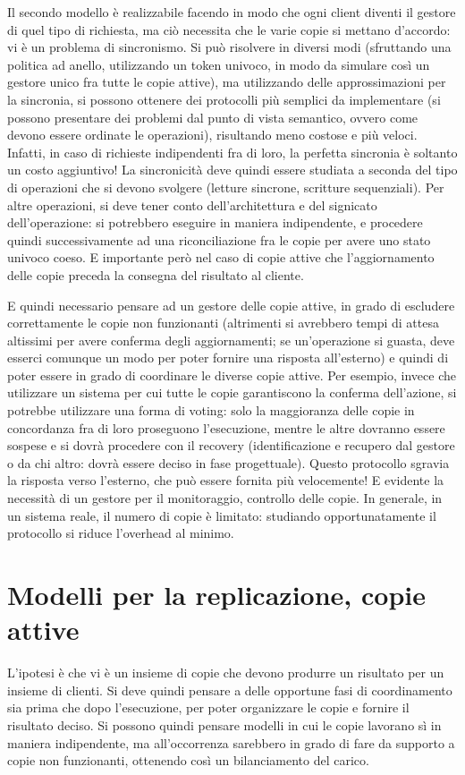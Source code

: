 Il secondo modello è realizzabile facendo in modo che ogni client diventi il
gestore di quel tipo di richiesta, ma
ciò necessita che le varie copie si mettano d'accordo: vi è un problema di
sincronismo. Si può risolvere in diversi
modi (sfruttando una politica ad anello, utilizzando un token univoco, in modo
da simulare così un gestore unico fra
tutte le copie attive), ma utilizzando delle approssimazioni per la sincronia,
si possono ottenere dei protocolli più
semplici da implementare (si possono presentare dei problemi dal punto di vista
semantico, ovvero come devono essere
ordinate le operazioni), risultando meno costose e più veloci. Infatti, in caso
di richieste indipendenti fra di loro,
la perfetta sincronia è soltanto un costo aggiuntivo! La sincronicità deve
quindi essere studiata a seconda del tipo di
operazioni che si devono svolgere (letture sincrone, scritture sequenziali).
Per altre operazioni, si deve tener conto
dell'architettura e del signicato dell'operazione: si potrebbero eseguire in
maniera indipendente, e procedere quindi
successivamente ad una riconciliazione fra le copie per avere uno stato univoco
coeso. E importante però nel caso di
copie attive che l'aggiornamento delle copie preceda la consegna del risultato
al cliente.

E quindi necessario pensare ad un gestore delle copie attive, in grado di
escludere correttamente le copie non
funzionanti (altrimenti si avrebbero tempi di attesa altissimi per avere
conferma degli aggiornamenti; se un'operazione
si guasta, deve esserci comunque un modo per poter fornire una risposta
all'esterno) e quindi di poter essere in grado
di coordinare le diverse copie attive. Per esempio, invece che utilizzare un
sistema per cui tutte le copie garantiscono
la conferma dell'azione, si potrebbe utilizzare una forma di voting: solo la
maggioranza delle copie in concordanza fra
di loro proseguono l'esecuzione, mentre le altre dovranno essere sospese e si
dovrà procedere con il recovery
(identificazione e recupero dal gestore o da chi altro: dovrà essere deciso in
fase progettuale).
Questo protocollo sgravia la risposta verso l'esterno, che può essere fornita
più velocemente! E evidente la necessità
di un gestore per il monitoraggio, controllo delle copie. In generale, in un
sistema reale, il numero di copie è
limitato: studiando opportunatamente il protocollo si riduce l'overhead al
minimo.
\section{Modelli per la replicazione, copie attive}
L'ipotesi è che vi è un insieme di copie che devono produrre un risultato per
un insieme di clienti. Si deve quindi
pensare a delle opportune fasi di coordinamento sia prima che dopo
l'esecuzione, per poter organizzare le copie e
fornire il risultato deciso. Si possono quindi pensare modelli in cui le copie
lavorano sì in maniera indipendente,
ma all'occorrenza sarebbero in grado di fare da supporto a copie non
funzionanti, ottenendo così un bilanciamento del
carico.

